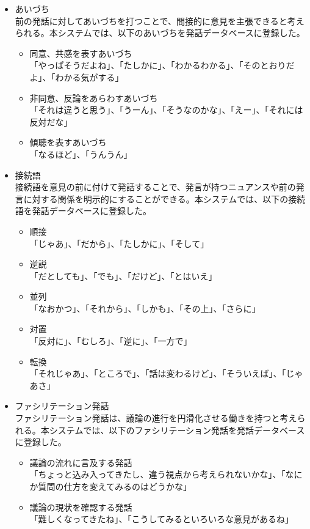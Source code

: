 \documentclass[11pt, a4paper]{jreport} %
\begin{document}
\begin{itemize}
\item あいづち\\
前の発話に対してあいづちを打つことで、間接的に意見を主張できると考えられる。本システムでは、以下のあいづちを発話データベースに登録した。
\begin{itemize}
\item 同意、共感を表すあいづち\\
「やっぱそうだよね」、「たしかに」、「わかるわかる」、「そのとおりだよ」、「わかる気がする」
\item 非同意、反論をあらわすあいづち\\
「それは違うと思う」、「うーん」、「そうなのかな」、「えー」、「それには反対だな」
\item 傾聴を表すあいづち\\
「なるほど」、「うんうん」

\end{itemize}

\item 接続語\\
接続語を意見の前に付けて発話することで、発言が持つニュアンスや前の発言に対する関係を明示的にすることができる。本システムでは、以下の接続語を発話データベースに登録した。
\begin{itemize}
\item 順接\\
「じゃあ」、「だから」、「たしかに」、「そして」
\item 逆説\\
「だとしても」、「でも」、「だけど」、「とはいえ」
\item 並列\\
「なおかつ」、「それから」、「しかも」、「その上」、「さらに」
\item 対置\\
「反対に」、「むしろ」、「逆に」、「一方で」
\item 転換\\
「それじゃあ」、「ところで」、「話は変わるけど」、「そういえば」、「じゃあさ」
\end{itemize}

\item ファシリテーション発話\\
ファシリテーション発話は、議論の進行を円滑化させる働きを持つと考えられる。本システムでは、以下のファシリテーション発話を発話データベースに登録した。
\begin{itemize}
\item 議論の流れに言及する発話\\
「ちょっと込み入ってきたし、違う視点から考えられないかな」、「なにか質問の仕方を変えてみるのはどうかな」
\item 議論の現状を確認する発話\\
「難しくなってきたね」、「こうしてみるといろいろな意見があるね」
\end{itemize}

\end{itemize}
\end{document}
